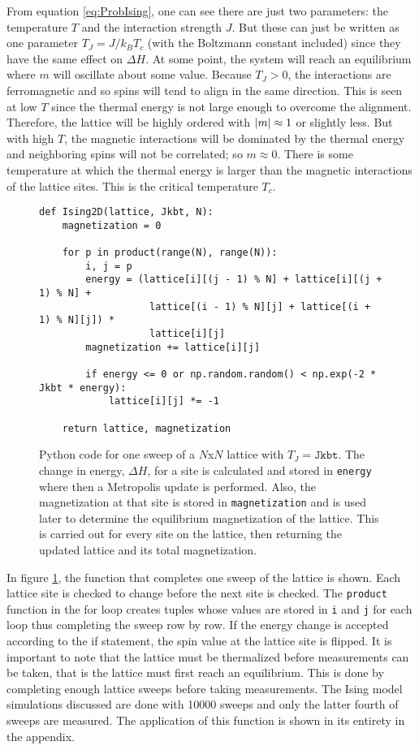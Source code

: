 \documentclass[11pt]{article}
\begin{document}
From equation \ref{eq:ProbIsing}, one can see there are just two parameters: the temperature $T$ and the interaction strength $J$. But these can just be written as one parameter $T_J=J/k_BT_c$ (with the Boltzmann constant included) since they have the same effect on $\Delta H$. At some point, the system will reach an equilibrium where $m$ will oscillate about some value. Because $T_J>0$, the interactions are ferromagnetic and so spins will tend to align in the same direction. This is seen at low $T$ since the thermal energy is not large enough to overcome the alignment. Therefore, the lattice will be highly ordered with $\abs{m}\approx1$ or slightly less. But with high $T$, the magnetic interactions will be dominated by the thermal energy and neighboring spins will not be correlated; so $m\approx0$. There is some temperature at which the thermal energy is larger than the magnetic interactions of the lattice sites. This is the critical temperature $T_c$.
\begin{figure}[ht]
\begin{lstlisting}
def Ising2D(lattice, Jkbt, N):
    magnetization = 0

    for p in product(range(N), range(N)):
        i, j = p
        energy = (lattice[i][(j - 1) % N] + lattice[i][(j + 1) % N] +
                   lattice[(i - 1) % N][j] + lattice[(i + 1) % N][j]) *
                   lattice[i][j]
        magnetization += lattice[i][j]

        if energy <= 0 or np.random.random() < np.exp(-2 * Jkbt * energy):
            lattice[i][j] *= -1

    return lattice, magnetization
\end{lstlisting}
    \caption{Python code for one sweep of a $N$x$N$ lattice with $T_J=\texttt{Jkbt}$. The change in energy, $\Delta H$, for a site is calculated and stored in \texttt{energy} where then a Metropolis update is performed. Also, the magnetization at that site is stored in \texttt{magnetization} and is used later to determine the equilibrium magnetization of the lattice. This is carried out for every site on the lattice, then returning the updated lattice and its total magnetization.} \label{fig:Ising2DCode}
\end{figure}

In figure \ref{fig:Ising2DCode}, the function that completes one sweep of the lattice is shown. Each lattice site is checked to change before the next site is checked. The \texttt{product} function in the for loop creates tuples whose values are stored in \texttt{i} and \texttt{j} for each loop thus completing the sweep row by row. If the energy change is accepted according to the if statement, the spin value at the lattice site is flipped. It is important to note that the lattice must be thermalized before measurements can be taken, that is the lattice must first reach an equilibrium. This is done by completing enough lattice sweeps before taking measurements. The Ising model simulations discussed are done with 10000 sweeps and only the latter fourth of sweeps are measured. The application of this function is shown in its entirety in the appendix. 
\end{document}
